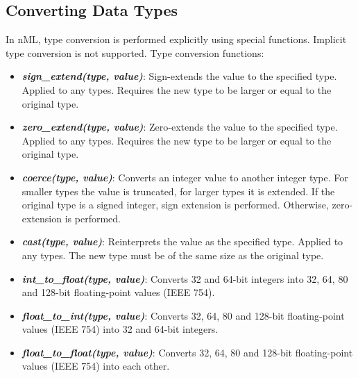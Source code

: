 \documentclass[oneside,final,14pt]{extreport}
\begin{document}
\subsection{Converting Data Types}

In nML, type conversion is performed explicitly using special functions.
Implicit type conversion is not supported. Type conversion functions:

\begin{itemize}
\item \textbf{\textit{sign{\_}extend(type, value)}}:
Sign-extends the value to the specified type. Applied to any types. Requires
the new type to be larger or equal to the original type.

\item \textbf{\textit{zero{\_}extend(type, value)}}:
Zero-extends the value to the specified type. Applied to any types. Requires
the new type to be larger or equal to the original type.

\item \textbf{\textit{coerce(type, value)}}:
Converts an integer value to another integer type. For smaller types the value
is truncated, for larger types it is extended. If the original type is a signed
integer, sign extension is performed. Otherwise, zero-extension is performed.

\item \textbf{\textit{cast(type, value)}}:
Reinterprets the value as the specified type. Applied to any types. The new type
must be of the same size as the original type.

\item \textbf{\textit{int{\_}to{\_}float(type, value)}}:
Converts 32 and 64-bit integers into 32, 64, 80 and 128-bit floating-point
values (IEEE 754).

\item \textbf{\textit{float{\_}to{\_}int(type, value)}}:
Converts 32, 64, 80 and 128-bit floating-point values (IEEE 754) into 32 and
64-bit integers.

\item \textbf{\textit{float{\_}to{\_}float(type, value)}}:
Converts 32, 64, 80 and 128-bit floating-point values (IEEE 754) into each
other.

\end{itemize}




\end{document}
